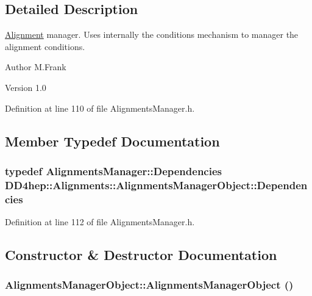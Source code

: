 \subsection{Detailed Description}
\hyperlink{class_d_d4hep_1_1_alignments_1_1_alignment}{Alignment} manager. Uses internally the conditions mechanism to manager the alignment conditions.

\begin{DoxyAuthor}{Author}
M.Frank 
\end{DoxyAuthor}
\begin{DoxyVersion}{Version}
1.0 
\end{DoxyVersion}


Definition at line 110 of file AlignmentsManager.h.

\subsection{Member Typedef Documentation}
\hypertarget{class_d_d4hep_1_1_alignments_1_1_alignments_manager_object_a833ee244e731bbe8cf28bb209181dabc}{
\subsubsection[{Dependencies}]{\setlength{\rightskip}{0pt plus 5cm}typedef {\bf AlignmentsManager::Dependencies} {\bf DD4hep::Alignments::AlignmentsManagerObject::Dependencies}}}
\label{class_d_d4hep_1_1_alignments_1_1_alignments_manager_object_a833ee244e731bbe8cf28bb209181dabc}


Definition at line 112 of file AlignmentsManager.h.

\subsection{Constructor \& Destructor Documentation}
\hypertarget{class_d_d4hep_1_1_alignments_1_1_alignments_manager_object_a8fb4e0202704fdcf8101a42494deca7b}{
\subsubsection[{AlignmentsManagerObject}]{\setlength{\rightskip}{0pt plus 5cm}AlignmentsManagerObject::AlignmentsManagerObject ()}}
\label{class_d_d4hep_1_1_alignments_1_1_alignments_manager_object_a8fb4e0202704fdcf8101a42494deca7b}


